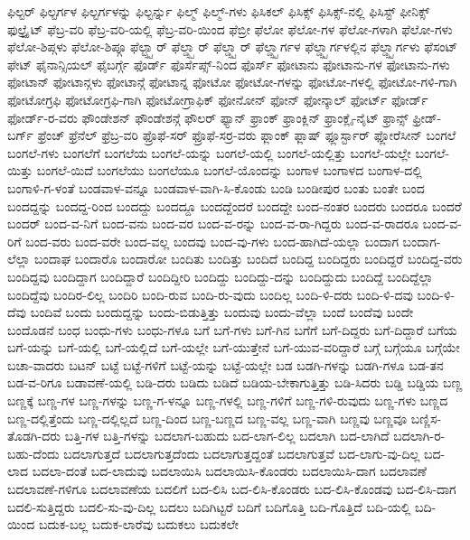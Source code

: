 {ಫಿಲ್ಟರ್
ಫಿಲ್ಟರ್ಗಳ
ಫಿಲ್ಟರ್ಗಳನ್ನು
ಫಿಲ್ಟರ್ನ್ನು
ಫಿಲ್ಮ್
ಫಿಲ್ಮ್-ಗಳು
ಫಿಸಿಕಲ್
ಫಿಸಿಕ್ಸ್
ಫಿಸಿಕ್ಸ್-ನಲ್ಲಿ
ಫಿಸಿಸ್ಟ್
ಫೀನಿಕ್ಸ್
ಫುಲ್ಬ್ರೈಟ್
ಫೆಬ್ರ-ವರಿ
ಫೆಬ್ರ-ವರಿ-ಯಲ್ಲಿ
ಫೆಬ್ರ-ವರಿ-ಯಿಂದ
ಫೆಬ್ರೀ
ಫೆಲೋ
ಫೆಲೋ-ಗಳ
ಫೆಲೋ-ಗಳಾಗಿ
ಫೆಲೋ-ಗಳು
ಫೆಲೋ-ಶಿಪ್ಗಳು
ಫೆಲೋ-ಶಿಪ್ಗೂ
ಫೆಲ್ಟ್ಸ್ಟಾರ್
ಫೆಲ್ಡ್ಸ್ಪಾರ್
ಫೆಲ್ಡ್ಸ್ಟಾರ್
ಫೆಲ್ಡ್ಸ್ಟಾರ್ಗಳ
ಫೆಲ್ಡ್ಸ್ಟಾರ್ಗಳಲ್ಲಿನ
ಫೆಲ್ಡ್ಸ್ಟಾರ್ಗಳು
ಫೆಸಂಟ್
ಫೇಟ್
ಫೈನಾನ್ಸಿಯಲ್
ಫೈಬರ್ಗ್ಗೆ
ಫೊರ್ಡ್
ಫೊರ್ಸೆಪ್ಸ್-ನಿಂದ
ಫೊರ್ಸ್
ಫೋಟಾನು
ಫೋಟಾನು-ಗಳ
ಫೋಟಾನು-ಗಳು
ಫೋಟಾನ್
ಫೋಟಾನ್ಗಳು
ಫೋಟಾನ್ಗೆ
ಫೋಟಾನ್ನ
ಫೋಟೋ
ಫೋಟೋ-ಗಳನ್ನು
ಫೋಟೋ-ಗಳಲ್ಲಿ
ಫೋಟೋ-ಗಳಿ-ಗಾಗಿ
ಫೋಟೋಗ್ರಫಿ
ಫೋಟೋಗ್ರಫಿ-ಗಾಗಿ
ಫೋಟೋಗ್ರಾಫಿಕ್
ಫೋನೋನ್
ಫೋನ್
ಫೋನ್ಕಾಲ್
ಫೋರ್ಟ್
ಫೋರ್ಡ್
ಫೋರ್ಡ್-ರ-ವರು
ಫೌಂಡೇಶನ್
ಫೌಂಡೇಶನ್ಗೆ
ಫೌಲರ್
ಫ್ಯಾನ್
ಫ್ರಾಂಕ್
ಫ್ರಾಂಕ್ಲಿನ್
ಫ್ರಾಂಕ್ಲೈ-ನೈಟ್
ಫ್ರಾನ್ಸ್
ಫ್ರೀಡ್-ಬರ್ಗ್
ಫ್ರೆಂಚ್
ಫ್ರೆನೆಲ್
ಫ್ರೆಬ್ರ-ವರಿ
ಫ್ರೊಫೆ-ಸರ್
ಫ್ರೊಫೆ-ಸರ್ರ-ವರು
ಫ್ಲಾಂಕ್
ಫ್ಲಾಷ್
ಫ್ಲೂರ್ಸ್ಟಾರ್
ಫ್ಲೋರೆಸೀನ್
ಬಂಗಲೆ
ಬಂಗಲೆ-ಗಳು
ಬಂಗಲೆಗೆ
ಬಂಗಲೆಯ
ಬಂಗಲೆ-ಯನ್ನು
ಬಂಗಲೆ-ಯಲ್ಲಿ
ಬಂಗಲೆ-ಯಲ್ಲಿತ್ತು
ಬಂಗಲೆ-ಯಲ್ಲೇ
ಬಂಗಲೆ-ಯಿತ್ತು
ಬಂಗಲೆ-ಯಿದೆ
ಬಂಗಲೆಯು
ಬಂಗಲೆಯೂ
ಬಂಗಲೆ-ಯೊಂದನ್ನು
ಬಂಗಾಳ
ಬಂಗಾಳದ
ಬಂಗಾಳ-ದಲ್ಲಿ
ಬಂಗಾಳಿ-ಗ-ಳಂತೆ
ಬಂಡವಾಳ-ವನ್ನೂ
ಬಂಡವಾಳ-ವಾಗಿ-ಸಿ-ಕೊಂಡು
ಬಂಡಿ
ಬಂಡೀಪುರ
ಬಂತು
ಬಂತೇ
ಬಂದ
ಬಂದದ್ದನ್ನು
ಬಂದದ್ದ-ರಿಂದ
ಬಂದದ್ದು
ಬಂದದ್ದೂ
ಬಂದದ್ದೆಂದರೆ
ಬಂದದ್ದೇ
ಬಂದ-ನಂತರ
ಬಂದರು
ಬಂದರೂ
ಬಂದರೆ
ಬಂದರ್
ಬಂದ-ವ-ನಿಗೆ
ಬಂದ-ವನು
ಬಂದ-ವರ
ಬಂದ-ವ-ರನ್ನು
ಬಂದ-ವ-ರಾ-ಗಿದ್ದರು
ಬಂದ-ವ-ರಾದರೂ
ಬಂದ-ವ-ರಿಗೆ
ಬಂದ-ವರು
ಬಂದ-ವರೇ
ಬಂದ-ವಲ್ಲ
ಬಂದವು
ಬಂದ-ವು-ಗಳು
ಬಂದ-ಹಾಗಿದೆ-ಯಲ್ಲಾ
ಬಂದಾಗ
ಬಂದಾಗ-ಲೆಲ್ಲಾ
ಬಂದಾಘ
ಬಂದಾರೊ
ಬಂದಾರೋ
ಬಂದಿತು
ಬಂದಿತ್ತು
ಬಂದಿದೆ
ಬಂದಿದ್ದ
ಬಂದಿದ್ದರು
ಬಂದಿದ್ದರೆ
ಬಂದಿದ್ದ-ವರು
ಬಂದಿದ್ದವು
ಬಂದಿದ್ದಾಗ
ಬಂದಿದ್ದಾರೆ
ಬಂದಿದ್ದೀರಿ
ಬಂದಿದ್ದು
ಬಂದಿದ್ದು-ದನ್ನು
ಬಂದಿದ್ದುದು
ಬಂದಿದ್ದೆ
ಬಂದಿದ್ದೆಲ್ಲಾ
ಬಂದಿದ್ದೆವು
ಬಂದಿರ-ಲಿಲ್ಲ
ಬಂದಿರಿ
ಬಂದಿ-ರುವ
ಬಂದಿ-ರು-ವುದು
ಬಂದಿಲ್ಲ
ಬಂದಿ-ಳಿ-ದರು
ಬಂದಿ-ಳಿ-ದವು
ಬಂದಿ-ಳಿ-ದೆವು
ಬಂದಿವೆ
ಬಂದು
ಬಂದುದ್ದನ್ನು
ಬಂದು-ಬಿಡುತ್ತಿತ್ತು
ಬಂದುವು
ಬಂದು-ವೆಲ್ಲಾ
ಬಂದೆ
ಬಂದೆವು
ಬಂದೇ
ಬಂದೊಡನೆ
ಬಂಧ
ಬಂಧು-ಗಳು
ಬಂಧು-ಗಳೂ
ಬಗೆ
ಬಗೆ-ಗಳು
ಬಗೆ-ಗಿನ
ಬಗೆಗೆ
ಬಗೆ-ದಿದ್ದರು
ಬಗೆ-ದಿದ್ದಾರೆ
ಬಗೆಯ
ಬಗೆ-ಯನ್ನು
ಬಗೆ-ಯಲ್ಲಿ
ಬಗೆ-ಯಲ್ಲಿದೆ
ಬಗೆ-ಯಲ್ಲೇ
ಬಗೆ-ಯುತ್ತೇನೆ
ಬಗೆ-ಯುವ-ವರಿದ್ದಾರೆ
ಬಗ್ಗೆ
ಬಗ್ಗೆಯೂ
ಬಗ್ಗೆಯೇ
ಬಚಾ-ವಾದರು
ಬಟನ್
ಬಟ್ಟೆ
ಬಟ್ಟೆ-ಗಳಿಗೆ
ಬಟ್ಟೆ-ಯನ್ನು
ಬಟ್ಟೆ-ಯಲ್ಲೇ
ಬಡ
ಬಡಗಿ-ಗಳನ್ನು
ಬಡಗಿ-ಗಳೂ
ಬಡ-ತನ
ಬಡ-ವ-ರಿಗೂ
ಬಡಾವಣೆ-ಯಲ್ಲಿ
ಬಡಿ-ದರು
ಬಡಿದು
ಬಡಿದೆ
ಬಡಿಯ-ಬೇಕಾಗುತ್ತಿತ್ತು
ಬಡಿ-ಸಿದರು
ಬಡ್ಡಿ
ಬಡ್ಡಿಯ
ಬಣ್ಣ
ಬಣ್ಣಕ್ಕೆ
ಬಣ್ಣ-ಗಳ
ಬಣ್ಣ-ಗಳನ್ನು
ಬಣ್ಣ-ಗ-ಳನ್ನೂ
ಬಣ್ಣ-ಗಳಲ್ಲಿ
ಬಣ್ಣ-ಗಳಿಗೆ
ಬಣ್ಣ-ಗಳಿ-ರುವುದು
ಬಣ್ಣ-ಗಳು
ಬಣ್ಣದ
ಬಣ್ಣ-ದಲ್ಲಿತ್ತೆಂದು
ಬಣ್ಣ-ದಲ್ಲಿಲ್ಲದೆ
ಬಣ್ಣ-ದಿಂದ
ಬಣ್ಣ-ಬಣ್ಣದ
ಬಣ್ಣ-ವಲ್ಲ
ಬಣ್ಣ-ವಾಗಿ
ಬಣ್ಣವು
ಬಣ್ಣವೂ
ಬಣ್ಣಿಸ-ತೊಡಗಿ-ದರು
ಬತ್ತಿ-ಗಳ
ಬತ್ತಿ-ಗಳನ್ನು
ಬದಲಾಗ-ಬಹುದು
ಬದ-ಲಾಗ-ಲಿಲ್ಲ
ಬದಲಾಗಿ
ಬದ-ಲಾಗಿದೆ
ಬದಲಾಗಿ-ರ-ಬಹು-ದೆಂದು
ಬದಲಾಗುತ್ತದೆ
ಬದಲಾಗುತ್ತದೆಂದು
ಬದಲಾಗುತ್ತದ್ದಂತೆ
ಬದಲಾಗುತ್ತವೆ
ಬದ-ಲಾಗು-ವು-ದಿಲ್ಲ
ಬದ-ಲಾದ
ಬದಲಾ-ದಂತೆ
ಬದ-ಲಾದುವು
ಬದಲಾಯಿಸಿ
ಬದಲಾಯಿಸಿ-ಕೊಂಡರು
ಬದಲಾಯಿಸಿ-ದಾಗ
ಬದಲಾವಣೆ
ಬದಲಾವಣೆ-ಗಳಿಗೂ
ಬದಲಾವಣೆಯ
ಬದಲಿಗೆ
ಬದ-ಲಿಸಿ
ಬದ-ಲಿಸಿ-ಕೊಂಡರು
ಬದ-ಲಿಸಿ-ಕೊಂಡವು
ಬದ-ಲಿಸಿ-ದಾಗ
ಬದಲಿ-ಸುತ್ತಿದ್ದರು
ಬದಲಿ-ಸು-ವು-ದಿಲ್ಲ
ಬದಲು
ಬದಿಗಿಟ್ಟರೆ
ಬದಿಗೆ
ಬದಿಗೊತ್ತಿ
ಬದಿ-ಗೊತ್ತಿದೆ
ಬದಿ-ಯಲ್ಲಿ
ಬದಿ-ಯಿಂದ
ಬದುಕ-ಬಲ್ಲ
ಬದುಕ-ಲಾರೆವು
ಬದುಕಲು
ಬದುಕಲೇ
}
